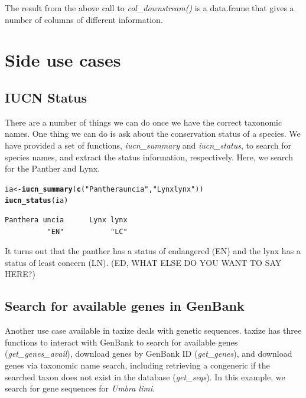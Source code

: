 \documentclass[letterpaper,superscriptaddress,showkeys,longbibliography,10pt]{revtex4-1}\usepackage{graphicx, color}
\makeatletter
\newcommand{\hlfunctioncall}[1]{\textcolor[rgb]{0.501960784313725,0,0.329411764705882}{\textbf{#1}}}%
\newcommand{\hlstring}[1]{\textcolor[rgb]{0.6,0.6,1}{#1}}%
\newenvironment{kframe}{%
 \def\at@end@of@kframe{}%
 \ifinner\ifhmode%
  \def\at@end@of@kframe{\end{minipage}}%
  \begin{minipage}{\columnwidth}%
 \fi\fi%
 \def\FrameCommand##1{\hskip\@totalleftmargin \hskip-\fboxsep
 \colorbox{shadecolor}{##1}\hskip-\fboxsep
     \hskip-\linewidth \hskip-\@totalleftmargin \hskip\columnwidth}%
 \MakeFramed {\advance\hsize-\width
   \@totalleftmargin\z@ \linewidth\hsize
   \@setminipage}}%
 {\par\unskip\endMakeFramed%
 \at@end@of@kframe}
\newenvironment{knitrout}{}{} %
\makeatother
\begin{document}
The result from the above call to \emph{col\_downstream()} is a data.frame that gives a number of columns of different information. 

\section{Side use cases}
\subsection{IUCN Status}

There are a number of things we can do once we have the correct taxonomic names. One thing we can do is ask about the conservation status of a species. We have provided a set of functions, \emph{iucn\_summary} and \emph{iucn\_status}, to search for species names, and extract the status information, respectively. Here, we search for the Panther and Lynx.  

\begin{knitrout}
\color{fgcolor}\begin{kframe}
\begin{alltt}
ia <- \hlfunctioncall{iucn_summary}(\hlfunctioncall{c}(\hlstring{"Panthera uncia"}, \hlstring{"Lynx lynx"}))
\hlfunctioncall{iucn_status}(ia)
\end{alltt}
\begin{verbatim}
Panthera uncia      Lynx lynx 
          "EN"           "LC" 
\end{verbatim}
\end{kframe}
\end{knitrout}


It turns out that the panther has a status of endangered (EN) and the lynx has a status of least concern (LN). (ED, WHAT ELSE DO YOU WANT TO SAY HERE?)

\subsection{Search for available genes in GenBank}

Another use case available in taxize deals with genetic sequences. taxize has three functions to interact with GenBank to search for available genes (\emph{get\_genes\_avail}), download genes by GenBank ID (\emph{get\_genes}), and download genes via taxonomic name search, including retrieving a congeneric if the searched taxon does not exist in the database (\emph{get\_seqs}). In this example, we search for gene sequences for \emph{Umbra limi}.
\end{document}
